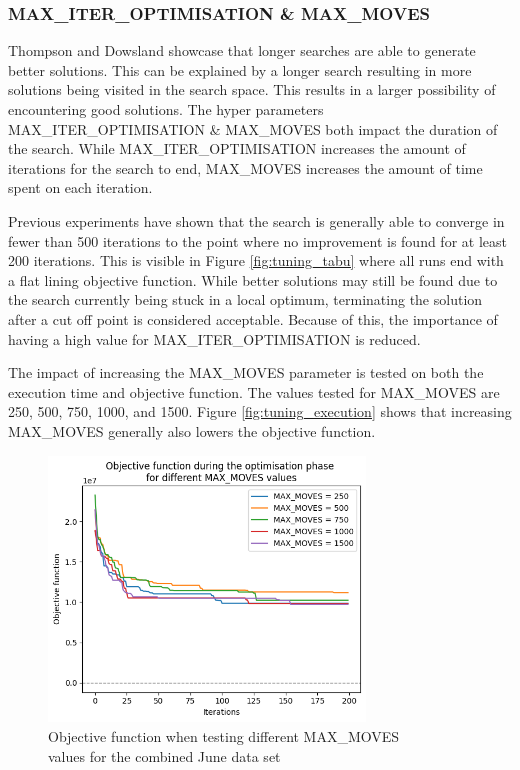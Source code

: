 \subsubsection{MAX\_ITER\_OPTIMISATION \& MAX\_MOVES}

Thompson and Dowsland \cite{thompson1996} showcase that longer searches are able to generate better solutions. This can be explained by a longer search resulting in more solutions being visited in the search space. This results in a larger possibility of encountering good solutions. The hyper parameters MAX\_ITER\_OPTIMISATION \& MAX\_MOVES both impact the duration of the search. While MAX\_ITER\_OPTIMISATION increases the amount of iterations for the search to end, MAX\_MOVES increases the amount of time spent on each iteration. 

Previous experiments have shown that the search is generally able to converge in fewer than 500 iterations to the point where no improvement is found for at least 200 iterations. This is visible in Figure \ref{fig:tuning_tabu} where all runs end with a flat lining objective function. While better solutions may still be found due to the search currently being stuck in a local optimum, terminating the solution after a cut off point is considered acceptable. Because of this, the importance of having a high value for MAX\_ITER\_OPTIMISATION is reduced.

The impact of increasing the MAX\_MOVES parameter is tested on both the execution time and objective function. The values tested for MAX\_MOVES are 250, 500, 750, 1000, and 1500. Figure \ref{fig:tuning_execution} shows that increasing MAX\_MOVES generally also lowers the objective function. 

\begin{figure}[H]
	\centering
	\includegraphics[width=0.75\textwidth]{images/tuning/max_moves_objective.png} 
	\caption{Objective function when testing different MAX\_MOVES \\ values for the combined June data set}
	\label{fig:tuning_objective}
\end{figure}

